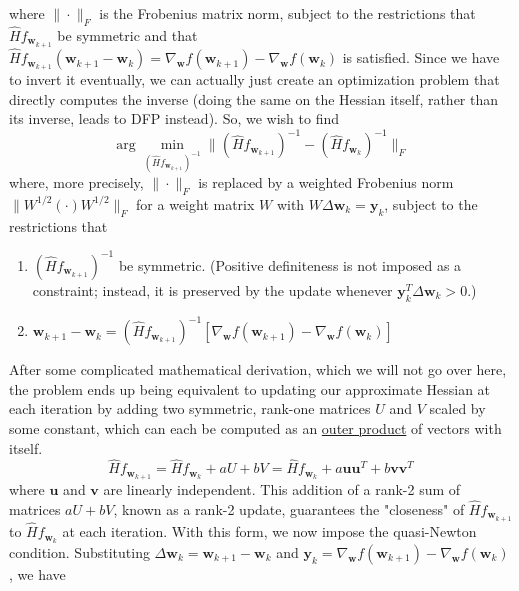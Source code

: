   where $\| \cdot \|_F$ is the Frobenius matrix norm, subject to the restrictions that $\hat{H} f_{\mathbf{w}_{k+1}}$ be symmetric and that $\hat{H} f_{\mathbf{w}_{k+1}} (\mathbf{w}_{k+1} - \mathbf{w}_k) = \nabla_\mathbf{w} f (\mathbf{w}_{k+1}) - \nabla_\mathbf{w} f (\mathbf{w}_k)$ is satisfied. Since we have to invert it eventually, we can actually just create an optimization problem that directly computes the inverse (doing the same on the Hessian itself, rather than its inverse, leads to DFP instead). So, we wish to find 
  \begin{equation}
    \arg \min_{(\hat{H} f_{\mathbf{w}_{k+1}})^{-1}} \|(\hat{H} f_{\mathbf{w}_{k+1}})^{-1} - (\hat{H} f_{\mathbf{w}_{k}})^{-1} \|_F
  \end{equation}
  where, more precisely, $\|\cdot\|_F$ is replaced by a weighted Frobenius norm $\|W^{1/2} (\cdot) W^{1/2}\|_F$ for a weight matrix $W$ with $W \Delta \mathbf{w}_k = \mathbf{y}_k$, subject to the restrictions that 
  \begin{enumerate}
      \item $(\hat{H} f_{\mathbf{w}_{k+1}})^{-1}$ be symmetric. (Positive definiteness is not imposed as a constraint; instead, it is preserved by the update whenever $\mathbf{y}_k^T \Delta \mathbf{w}_k > 0$.) 
      \item $\mathbf{w}_{k+1} - \mathbf{w}_k = (\hat{H} f_{\mathbf{w}_{k+1}})^{-1} [\nabla_\mathbf{w} f (\mathbf{w}_{k+1}) - \nabla_\mathbf{w} f (\mathbf{w}_k)]$
  \end{enumerate}
  After some complicated mathematical derivation, which we will not go over here, the problem ends up being equivalent to updating our approximate Hessian at each iteration by adding two symmetric, rank-one matrices $U$ and $V$ scaled by some constant, which can each be computed as an \hyperref[lin-def:outer-product]{outer product} of vectors with itself. 
  \begin{equation}
    \hat{H} f_{\mathbf{w}_{k+1}} = \hat{H} f_{\mathbf{w}_{k}} + a U + b V = \hat{H} f_{\mathbf{w}_{k}} + a \mathbf{u} \mathbf{u}^T + b \mathbf{v} \mathbf{v}^T
  \end{equation}
  where $\mathbf{u}$ and $\mathbf{v}$ are linearly independent. This addition of a rank-2 sum of matrices $a U + b V$, known as a rank-2 update, guarantees the "closeness" of $\hat{H} f_{\mathbf{w}_{k+1}}$ to $\hat{H} f_{\mathbf{w}_{k}}$ at each iteration. With this form, we now impose the quasi-Newton condition. Substituting $\Delta \mathbf{w}_k = \mathbf{w}_{k+1} - \mathbf{w}_k$ and $\mathbf{y}_k = \nabla_\mathbf{w} f (\mathbf{w}_{k+1}) - \nabla_\mathbf{w} f (\mathbf{w}_k)$, we have
